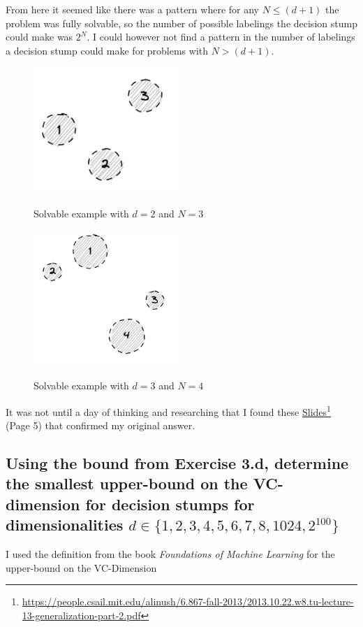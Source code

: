 \documentclass[11pt,a4paper]{article}
\begin{document}
From here it seemed like there was a pattern where for any $N \leq (d+1)$ the problem was fully solvable, so the number of possible labelings the decision stump could make was $2^N$. I could however not find a pattern in the number of labelings a decision stump could make for problems with $N > (d+1)$.

\begin{figure}[h]
    \caption{Solvable example with $d=2$ and $N=3$}
    \centering
    \includegraphics[width=0.5\textwidth]{d2n3_solvable.png}
    \label{fig:d2n3_solvable}
\end{figure}

\begin{figure}[h]
    \caption{Solvable example with $d=3$ and $N=4$}
    \centering
    \includegraphics[width=0.5\textwidth]{d3n4_solvable.png}
    \label{fig:d3n4_solvable}
\end{figure}


It was not until a day of thinking and researching that I found these \href{https://people.csail.mit.edu/alinush/6.867-fall-2013/2013.10.22.w8.tu-lecture-13-generalization-part-2.pdf}{\underline{Slides}}\footnote{\url{https://people.csail.mit.edu/alinush/6.867-fall-2013/2013.10.22.w8.tu-lecture-13-generalization-part-2.pdf}} (Page 5) that confirmed my original answer.

\subsection{Using the bound from Exercise 3.d, determine the smallest upper-bound on the VC-dimension for decision stumps for dimensionalities $d ∈ \{1, 2, 3, 4, 5, 6, 7, 8, 1024, 2^{100}\}$}
\label{sec:2e}
I used the definition from the book \textit{Foundations of Machine Learning} \cite{foundations_of_machine_learning} for the upper-bound on the VC-Dimension
\end{document}
